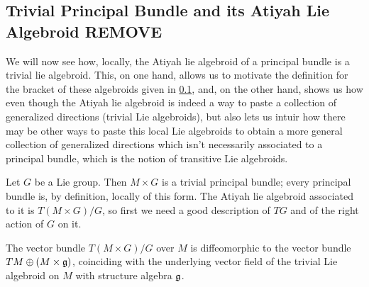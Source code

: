 \subsection{Trivial Principal Bundle and its Atiyah Lie Algebroid REMOVE}

We will now see how, locally, the Atiyah lie algebroid of a principal bundle is a trivial lie algebroid. This, on one hand, allows us to motivate the definition for the bracket of these algebroids given in \ref{}, and, on the other hand, shows us how even though the Atiyah lie algebroid is indeed a way to paste a collection of generalized directions (trivial Lie algebroids), but also lets us intuir how there may be other ways to paste this local Lie algebroids to obtain a more general collection of generalized directions which isn't necessarily associated to a principal bundle, which is the notion of transitive Lie algebroids.

Let $G$ be a Lie group. Then $M \times G$ is a trivial principal bundle; every principal bundle is, by definition, locally of this form. The Atiyah lie algebroid associated to it is $T(M \times G)/G$, so first we need a good description of $TG$ and of the right action of $G$ on it. 

\begin{proposition}
The vector bundle $T(M \times G)/G$ over $M$ is diffeomorphic to the vector bundle $TM \oplus (M \times \mathfrak{g})$, coinciding with the underlying vector field of the trivial Lie algebroid on $M$ with structure algebra $\mathfrak{g}$.
\end{proposition}

